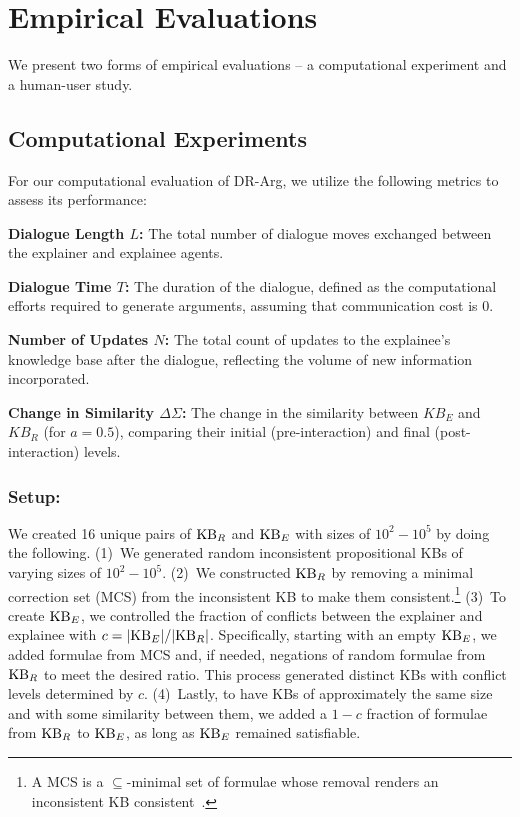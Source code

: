 \documentclass{article}
\begin{document}
\section{Empirical Evaluations}

We present two forms of empirical evaluations -- a computational experiment and a human-user study. 

\subsection{Computational Experiments}
\label{comp-eval}

For our computational evaluation of DR-Arg, we utilize the following metrics to assess its performance:
\squishlist
\item \textbf{Dialogue Length $L$:} The total number of dialogue moves exchanged between the explainer and explainee agents.
\item \textbf{Dialogue Time $T$:} The duration of the dialogue, defined as the computational efforts required to generate arguments, assuming that communication cost is $0$.

\item \textbf{Number of Updates $N$:} The total count of updates to the explainee's knowledge base after the dialogue, reflecting the volume of new information incorporated.


\item \textbf{Change in Similarity $\Delta \Sigma$:} The change in the similarity between $KB_E$ and $KB_R$ (for $a =0.5$), comparing their initial (pre-interaction) and final (post-interaction) levels. %

\squishend



\subsubsection{Setup:} 
We created 16 unique pairs of $\mathrm{KB}_R$ and $\mathrm{KB}_E$ with sizes of $10^2 - 10^5$ by doing the following. (1)~We generated random inconsistent propositional KBs of varying sizes of $10^2 - 10^5$. (2)~We constructed $\mathrm{KB}_R$ by removing a minimal correction set (MCS) from the inconsistent KB to make them consistent.\footnote{A MCS is a $\subseteq$-minimal set of formulae whose removal renders an inconsistent KB consistent~\citep{marques-silva-ijcai13}.} (3)~To create $\mathrm{KB}_E$, we controlled the fraction of conflicts between the explainer and explainee with $c = |\mathrm{KB}_E| / |\mathrm{KB}_R|$. Specifically, starting with an empty $\mathrm{KB}_E$, we added formulae from MCS and, if needed, negations of random formulae from $\mathrm{KB}_R$ to meet the desired ratio. This process generated distinct KBs with conflict levels determined by $c$. (4)~Lastly, to have KBs of approximately the same size and with some similarity between them, we added a $1-c$ fraction of formulae from $\mathrm{KB}_R$ to $\mathrm{KB}_E$, as long as $\mathrm{KB}_E$ remained satisfiable. %
\end{document}
